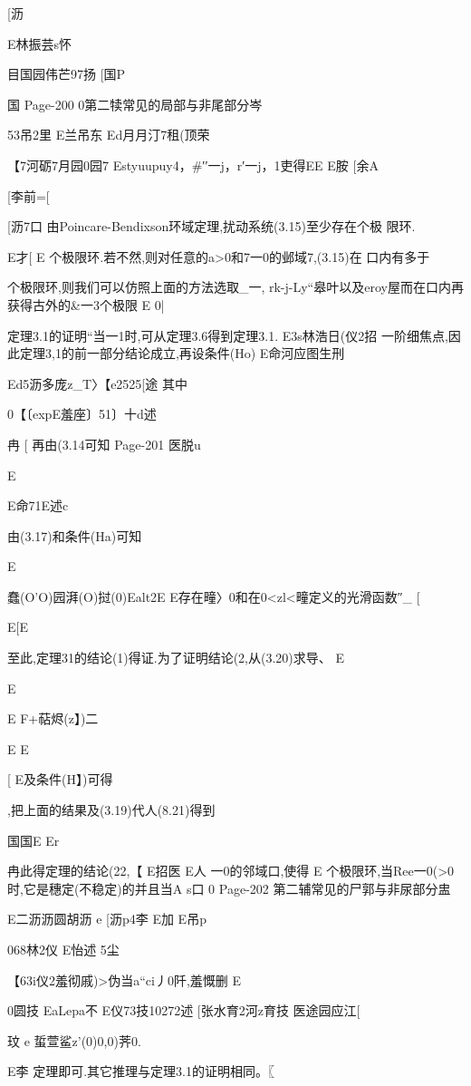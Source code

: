 {{{{{{{{{{{{{{{{[沥

E林振芸s怀

目国园伟芒97扬
[国P

国
Page-200
0第二犊常见的局部与非尾部分岑

53吊2里
E兰吊东
Ed月月汀7租(顶荣

【7河砺7月园0园7
Estyuupuy4，#′′一j，r′一j，1吏得EE
E胺
[余A

[李前=[

[沥7口
由Poincare-Bendixson环域定理,扰动系统(3.15)至少存在个极
限环.

E才[
E
个极限环.若不然,则对任意的a>0和7一0的邺域7,(3.15)在
口内有多于}个极限环,则我们可以仿照上面的方法选取_一,
rk-j-Ly“皋叶以及eroy屋而在口内再获得古外的&一3个极限
E
0|

定理3.1的证明“当一1时,可从定理3.6得到定理3.1.
E3s林浩日(仪2招
一阶细焦点,因此定理3,1的前一部分结论成立,再设条件(Ho)
E命河应图生刑

Ed5沥多庞z_T〉【e2525[途
其中

0【〔expE羞座〕51〕十d述

冉
[
再由(3.14可知
Page-201
医脱u

E

E命71E述c

由(3.17)和条件(Ha)可知

E

蠢(O'O)园湃(O)挝(0)Ealt2E
E存在疃〉0和在0<zl<疃定义的光滑函数″_
[

E[E

至此,定理31的结论(1)得证.为了证明结论(2,从(3.20)求导、
E

E

E
F+萜烬(z】)二

E
E

[
E及条件(H】)可得

,把上面的结果及(3.19)代人(8.21)得到

国国E
Er

冉此得定理的结论(22,【
E招医
E人
一0的邻域口,使得
E
个极限环,当Ree一0(>0时,它是穗定(不稳定)的并且当A
s口
0
Page-202
第二辅常见的尸郭与非尿部分盅

E二沥沥圆胡沥
e
[沥p4李
E加
E吊p

068林2仪
E怡述
5尘

【63i仪2羞彻戚)>伪当a“ci丿0阡,羞慨删
E

0圆技
EaLepa不
E仪73技10272述
[张水育2河z育技
医途园应江[

玟
e
蜇萱鲨z'(0)0,0)荠0.

E李
定理即可.其它推理与定理3.1的证明相同。〖

}}}}}}}}}}}}}}}
